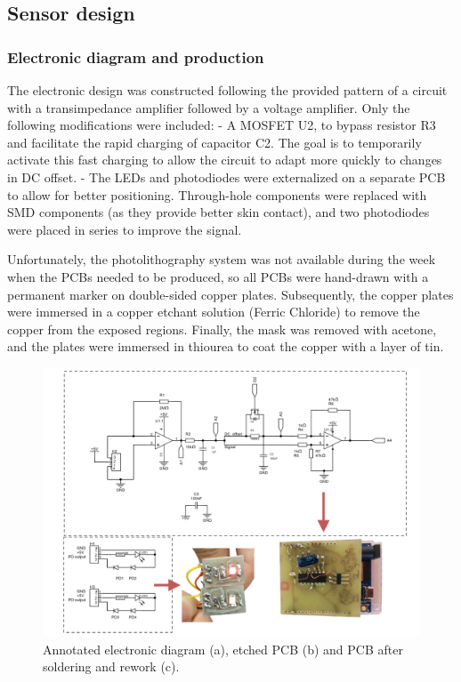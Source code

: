 \documentclass[conference]{IEEEtran}
\begin{document}
   \subsection{Sensor design}
      \subsubsection{Electronic diagram and production}
      The electronic design was constructed following the provided pattern of a circuit with a transimpedance amplifier followed by a voltage amplifier.
      Only the following modifications were included:
         - A MOSFET U2, to bypass resistor R3 and facilitate the rapid charging of capacitor C2. The goal is to temporarily activate this fast charging to allow the circuit to adapt
         more quickly to changes in DC offset.
         - The LEDs and photodiodes were externalized on a separate PCB to allow for better positioning. Through-hole components were replaced with SMD components (as they provide better skin contact),
         and two photodiodes were placed in series to improve the signal.

      Unfortunately, the photolithography system was not available during the week when the PCBs needed to be produced, so all PCBs were hand-drawn with a permanent marker on double-sided copper plates.
      Subsequently, the copper plates were immersed in a copper etchant solution (Ferric Chloride) to remove the copper from the exposed regions. Finally, the mask was removed with acetone, and the plates were immersed in thiourea to coat the copper with a layer of tin.

      \begin{figure}[!th]
         \centering
         \includegraphics[width=\textwidth]{images/ed2.png}
         \caption{Annotated electronic diagram (a), etched PCB (b) and PCB after soldering and rework (c).}
         \label{fig:circuit}
      \end{figure}
\end{document}
